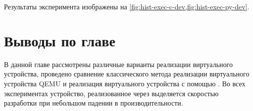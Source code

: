 Результаты эксперимента изображены на \cref{fig:hist-exec-c-dev,fig:hist-exec-py-dev}.


\section*{Выводы по главе}\label{sec:ch3/sec3}

В данной главе рассмотрены различные варианты реализации виртуального
устройства, проведено сравнение классического метода реализации виртуального устройства
QEMU и реализация виртуального устройства с помощью {\mylanguage}.
Во всех экспериментах устройство, реализованное через {\mylanguage} выделяется
скоростью разработки при небольшом падении в производительности.
